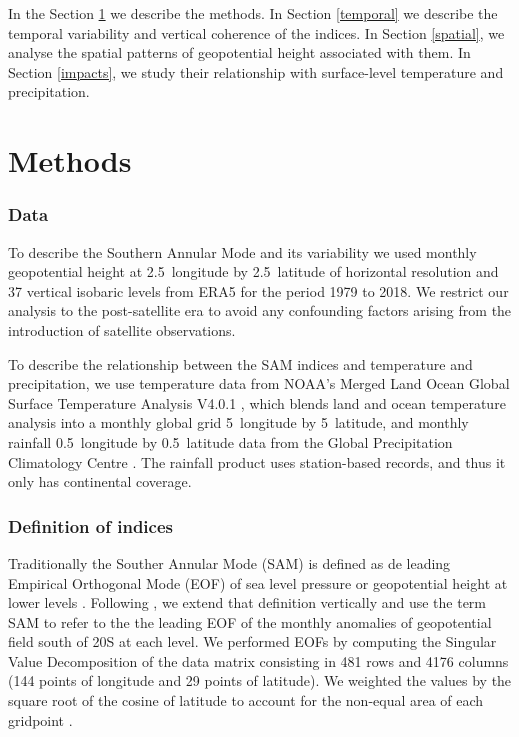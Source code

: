 \documentclass[]{ametsocV5}
\begin{document}
In the Section \ref{methods} we describe the methods. In Section \ref{temporal} we describe the temporal variability and vertical coherence of the indices. In Section \ref{spatial}, we analyse the spatial patterns of geopotential height associated with them. In Section \ref{impacts}, we study their relationship with surface-level temperature and precipitation.

\hypertarget{methods}{%
\section{Methods}\label{methods}}

\subsubsection{Data}

To describe the Southern Annular Mode and its variability we used monthly geopotential height at 2.5\degree~longitude by 2.5\degree~latitude of horizontal resolution and 37 vertical isobaric levels from ERA5 \citep{hersbach2020} for the period 1979 to 2018. We restrict our analysis to the post-satellite era to avoid any confounding factors arising from the introduction of satellite observations.

To describe the relationship between the SAM indices and temperature and precipitation, we use temperature data from NOAA's Merged Land Ocean Global Surface Temperature Analysis V4.0.1 \citep{smith2008, vose2012}, which blends land and ocean temperature analysis into a monthly global grid 5\degree~longitude by 5\degree~latitude, and monthly rainfall 0.5\degree~longitude by 0.5\degree~latitude data from the Global Precipitation Climatology Centre \citep{schneider2015, schneider2017}. The rainfall product uses station-based records, and thus it only has continental coverage.

\subsubsection{Definition of indices}

Traditionally the Souther Annular Mode (SAM) is defined as de leading Empirical Orthogonal Mode (EOF) of sea level pressure or geopotential height at lower levels \citep{ho2012}. Following \citet{baldwin2001}, we extend that definition vertically and use the term SAM to refer to the the leading EOF of the monthly anomalies of geopotential field south of 20\degree S at each level. We performed EOFs by computing the Singular Value Decomposition of the data matrix consisting in 481 rows and 4176 columns (144 points of longitude and 29 points of latitude). We weighted the values by the square root of the cosine of latitude to account for the non-equal area of each gridpoint \citep{chung1999}.
\end{document}
